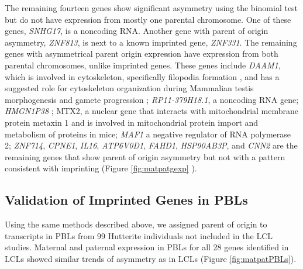 The remaining fourteen genes show significant asymmetry using the binomial test but do not have expression from mostly one parental chromosome. One of these genes, \emph{SNHG17}, is a noncoding RNA. Another gene with parent of origin asymmetry,  \emph{ZNF813}, is next to a known imprinted gene, \emph{ZNF331}. The remaining genes with asymmetrical parent origin expression have expression from both parental chromosomes, unlike imprinted genes. These genes include  \emph{DAAM1},  which is involved in cytoskeleton, specifically filopodia formation \citep{Hoffmann:2014ki, Luo:2016db}, and has a suggested role for cytoskeleton organization during Mammalian testis morphogenesis and gamete progression \citep{Pariante:2016kn};  \emph{RP11-379H18.1}, a noncoding RNA gene;  \emph{HMGN1P38} \citep{StrichmanAlmashanu:2003cw}; MTX2, a nuclear gene that interacts with mitochondrial membrane protein metaxin 1 and is involved in mitochondrial protein import and metabolism of proteins in mice;   \emph{MAF1} a negative regulator of RNA polymerase 2;  \emph{ZNF714},  \emph{CPNE1},  \emph{IL16},  \emph{ATP6V0D1},  \emph{FAHD1},  \emph{HSP90AB3P}, and  \emph{CNN2} are the remaining genes that show parent of origin asymmetry but not with a pattern consistent with imprinting (Figure \ref{fig:matpatgexp} ).

\subsection{Validation of Imprinted Genes in PBLs}\label{Validation of Imprinted Genes in PBLs}
Using the same methods described above, we assigned parent of origin to transcripts in PBLs from 99 Hutterite individuals not included in the LCL studies. Maternal and paternal expression in PBLs for all 28 genes identified in LCLs showed similar trends of asymmetry as in LCLs (Figure \ref{fig:matpatPBLs}). 


